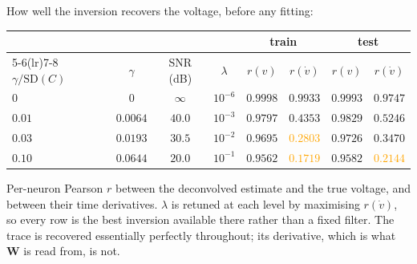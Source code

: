 \documentclass[11pt]{article}
\newcommand{\Mat}[1]{\mathbf{#1}}
\newcommand{\good}[1]{\textcolor{green!50!black}{#1}}
\newcommand{\bad}[1]{\textcolor{orange}{#1}}
\begin{document}
How well the inversion recovers the voltage, before any fitting:

\begin{center}
{\scriptsize
\setlength{\tabcolsep}{5pt}
\begin{tabular}{lccc cc cc}
\toprule
& & & & \multicolumn{2}{c}{train} & \multicolumn{2}{c}{test} \\
\cmidrule(lr){5-6}\cmidrule(lr){7-8}
$\gamma/\mathrm{SD}(C)$ & $\gamma$ & SNR (dB) & $\lambda$ & $r(v)$ & $r(\dot v)$ & $r(v)$ & $r(\dot v)$ \\
\midrule
$0$    & $0$       & $\infty$ & $10^{-6}$ & \good{$0.9998$} & \good{$0.9933$} & \good{$0.9993$} & \good{$0.9747$} \\
$0.01$ & $0.0064$  & $40.0$   & $10^{-3}$ & \good{$0.9797$} & $0.4353$        & \good{$0.9829$} & $0.5246$ \\
$0.03$ & $0.0193$  & $30.5$   & $10^{-2}$ & \good{$0.9695$} & \bad{$0.2803$}  & \good{$0.9726$} & $0.3470$ \\
$0.10$ & $0.0644$  & $20.0$   & $10^{-1}$ & \good{$0.9562$} & \bad{$0.1719$}  & \good{$0.9582$} & \bad{$0.2144$} \\
\bottomrule
\end{tabular}}

{\footnotesize Per-neuron Pearson $r$ between the deconvolved estimate and the
true voltage, and between their time derivatives. $\lambda$ is retuned at each
level by maximising $r(\dot v)$, so every row is the best inversion available
there rather than a fixed filter. The trace is recovered essentially perfectly
throughout; its derivative, which is what $\Mat{W}$ is read from, is not.}
\end{center}
\end{document}
